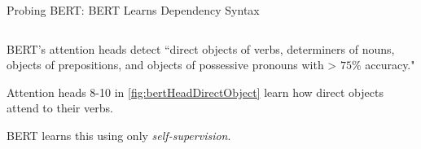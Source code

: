 \begin{frame}{Probing BERT: BERT Learns Dependency Syntax}
\begin{columns}
\begin{column}{0.4\textwidth}
            \begin{itemizeSpaced}{10pt}
            
            
                
                \pinkbox BERT's attention heads detect ``direct objects of verbs, determiners of nouns, objects of prepositions, and objects of possessive pronouns with > $75 \%$ accuracy."
                
                \item Attention heads 8-10 in \cref{fig:bertHeadDirectObject} learn how direct objects attend to their verbs. 
                
                \item BERT learns this using only \textit{self-supervision}. 
            \end{itemizeSpaced}
        \end{column}
    
    \end{columns}


\end{frame}




